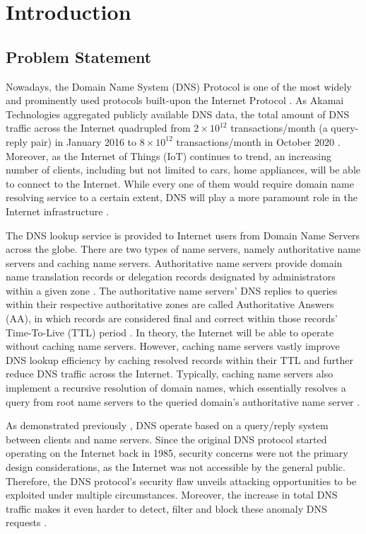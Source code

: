 \documentclass[a4paper]{report}
\begin{document}
\tableofcontents

\newpage
\setcounter{page}{1}

\chapter{Introduction}

\section{Problem Statement}
\label{section:introduction-problemstatement}

Nowadays, the Domain Name System (DNS) Protocol is one of the most widely and prominently used protocols built-upon the Internet Protocol \cite{RFC-1034}. As Akamai Technologies aggregated publicly available DNS data, the total amount of DNS traffic across the Internet quadrupled from $ 2 \times 10^{12}$ transactions/month (a query-reply pair) in January 2016 to $8 \times 10^{12}$ transactions/month in October 2020 \cite{DNS-Trends-and-Traffic}. Moreover, as the Internet of Things (IoT) continues to trend, an increasing number of clients, including but not limited to cars, home appliances, will be able to connect to the Internet. While every one of them would require domain name resolving service to a certain extent, DNS will play a more paramount role in the Internet infrastructure \cite{satam2015anomaly}.

The DNS lookup service is provided to Internet users from Domain Name Servers across the globe. There are two types of name servers, namely authoritative name servers and caching name servers. Authoritative name servers provide domain name translation records or delegation records designated by administrators within a given zone \cite{BCP-219}. The authoritative name servers' DNS replies to queries within their respective authoritative zones are called Authoritative Answers (AA), in which records are considered final and correct within those records' Time-To-Live (TTL) period \cite{BCP-219, RFC-1035}. In theory, the Internet will be able to operate without caching name servers. However, caching name servers vastly improve DNS lookup efficiency by caching resolved records within their TTL and further reduce DNS traffic across the Internet. Typically, caching name servers also implement a recursive resolution of domain names, which essentially resolves a query from root name servers to the queried domain's authoritative name server \cite{finch-2015}.

As demonstrated previously \cite{RFC-1034, RFC-1035}, DNS operate based on a query/reply system between clients and name servers. Since the original DNS protocol started operating on the Internet back in 1985, security concerns were not the primary design considerations, as the Internet was not accessible by the general public. Therefore, the DNS protocol's security flaw unveils attacking opportunities to be exploited under multiple circumstances\cite{antonakakis2010centralized}. Moreover, the increase in total DNS traffic makes it even harder to detect, filter and block these anomaly DNS requests \cite{kambourakis2007detecting}. 
\end{document}
